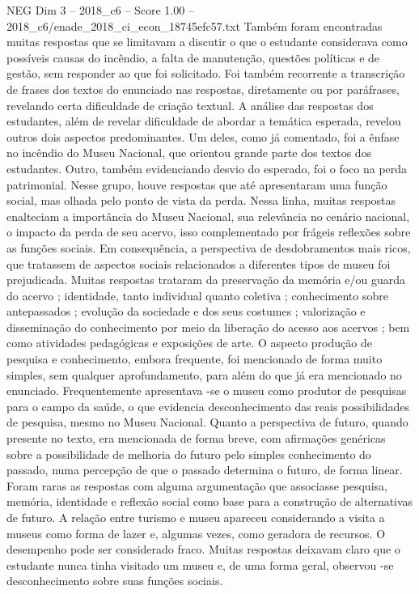 \begin{textsample}{NEG Dim 3 – 2018\_c6 – Score 1.00 – 2018\_c6/enade\_2018\_ci\_econ\_18745efc57.txt}
Também foram encontradas muitas respostas que se limitavam a discutir o que o estudante considerava como possíveis causas do incêndio, a falta de manutenção, questões políticas e de gestão, sem responder ao que foi solicitado.
Foi também recorrente a transcrição de frases dos textos do enunciado nas respostas, diretamente ou por paráfrases, revelando certa dificuldade de criação textual.
A análise das respostas dos estudantes, além de revelar dificuldade de abordar a temática esperada, revelou outros dois aspectos predominantes.
Um deles, como já comentado, foi a ênfase no incêndio do Museu Nacional, que orientou grande parte dos textos dos estudantes.
Outro, também evidenciando desvio do esperado, foi o foco na perda patrimonial.
Nesse grupo, houve respostas que até apresentaram uma função social, mas olhada pelo ponto de vista da perda.
Nessa linha, muitas respostas enalteciam a importância do Museu Nacional, sua relevância no cenário nacional, o impacto da perda de seu acervo, isso complementado por frágeis reflexões sobre as funções sociais.
Em consequência, a perspectiva de desdobramentos mais ricos, que tratassem de aspectos sociais relacionados a diferentes tipos de museu foi prejudicada.
Muitas respostas trataram da preservação da memória e/ou guarda do acervo ; identidade, tanto individual quanto coletiva ; conhecimento sobre antepassados ; evolução da sociedade e dos seus costumes ; valorização e disseminação do conhecimento por meio da liberação do acesso aos acervos ; bem como atividades pedagógicas e exposições de arte.
O aspecto produção de pesquisa e conhecimento, embora frequente, foi mencionado de forma muito simples, sem qualquer aprofundamento, para além do que já era mencionado no enunciado.
Frequentemente apresentava -se o museu como produtor de pesquisas para o campo da saúde, o que evidencia desconhecimento das reais possibilidades de pesquisa, mesmo no Museu Nacional.
Quanto a perspectiva de futuro, quando presente no texto, era mencionada de forma breve, com afirmações genéricas sobre a possibilidade de melhoria do futuro pelo simples conhecimento do passado, numa percepção de que o passado determina o futuro, de forma linear.
Foram raras as respostas com alguma argumentação que associasse pesquisa, memória, identidade e reflexão social como base para a construção de alternativas de futuro.
A relação entre turismo e museu apareceu considerando a visita a museus como forma de lazer e, algumas vezes, como geradora de recursos.
O desempenho pode ser considerado fraco.
Muitas respostas deixavam claro que o estudante nunca tinha visitado um museu e, de uma forma geral, observou -se desconhecimento sobre suas funções sociais.

\end{textsample}
